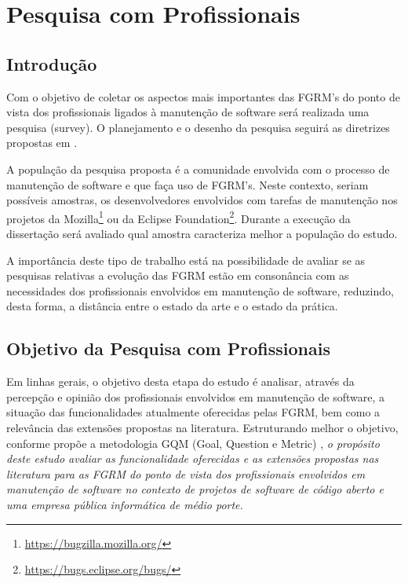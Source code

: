 
\chapter{Pesquisa com Profissionais}
\label{ch:pesquisa-profissionais}

\section{Introdução}
\label{sec:pesquisa-profissionais-intro}


Com o objetivo de coletar os aspectos mais importantes das FGRM's do ponto de
vista dos profissionais ligados à manutenção de software será realizada uma
 pesquisa (survey). O planejamento e o desenho da pesquisa seguirá as diretrizes propostas em \cite{wohlin2012experimentation}.

A população da pesquisa proposta é a comunidade envolvida com o processo de
manutenção de software e que faça uso de FGRM's. Neste contexto, seriam
possíveis amostras, os desenvolvedores envolvidos com tarefas de manutenção nos
projetos da Mozilla\footnote{\url{https://bugzilla.mozilla.org/}} ou da
Eclipse Foundation\footnote{\url{https://bugs.eclipse.org/bugs/}}. Durante a
execução da dissertação será avaliado qual amostra caracteriza melhor a
população do estudo.

A importância deste tipo de trabalho está na possibilidade de avaliar se as pesquisas relativas a
evolução das FGRM estão em consonância com as necessidades dos profissionais envolvidos em
manutenção de software, reduzindo, desta forma, a distância entre o estado da arte e o estado da
prática.
\section{Objetivo da Pesquisa com Profissionais}
\label{sec:objetivo_da_pesquisa_com_profissionais}

Em linhas gerais, o objetivo desta etapa do estudo é analisar, através da percepção e opinião dos
profissionais envolvidos em manutenção de software, a situação das funcionalidades atualmente
oferecidas pelas FGRM, bem como a relevância das extensões propostas na literatura. Estruturando
melhor o objetivo, conforme propõe a metodologia GQM (Goal, Question e Metric) \cite{van2002goal},
\textit{o propósito deste estudo avaliar as funcionalidade oferecidas e as extensões propostas nas literatura para as FGRM do ponto de vista dos profissionais envolvidos em manutenção de software no contexto de projetos de software de código aberto e uma empresa pública informática de médio porte.}  

